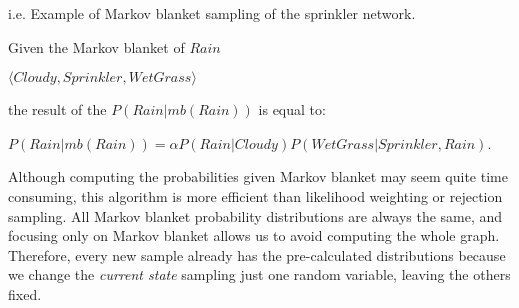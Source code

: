 \begin{example}
    i.e. Example of Markov blanket sampling of the sprinkler network. \vspace{3.5pt}

    Given the Markov blanket of $Rain$ \vspace{3.5pt}
    \begin{center}
        $\langle Cloudy, Sprinkler, WetGrass \rangle$
    \end{center} \vspace{3.5pt}
    the result of the $P(Rain|mb(Rain))$ is equal to: \vspace{3.5pt}
    \begin{center}
        $P(Rain|mb(Rain)) = \alpha P(Rain|Cloudy)P(WetGrass|Sprinkler, Rain)$.
    \end{center} \vspace{3.5pt}
\end{example}
Although computing the probabilities given Markov blanket may seem quite time consuming, this algorithm is more efficient than likelihood weighting or rejection sampling. 
All Markov blanket probability distributions are always the same, and focusing only on Markov blanket allows us to avoid computing the whole graph. Therefore,
every new sample already has the pre-calculated distributions because we change the \textit{current state} sampling just one random variable, leaving the others fixed. 
